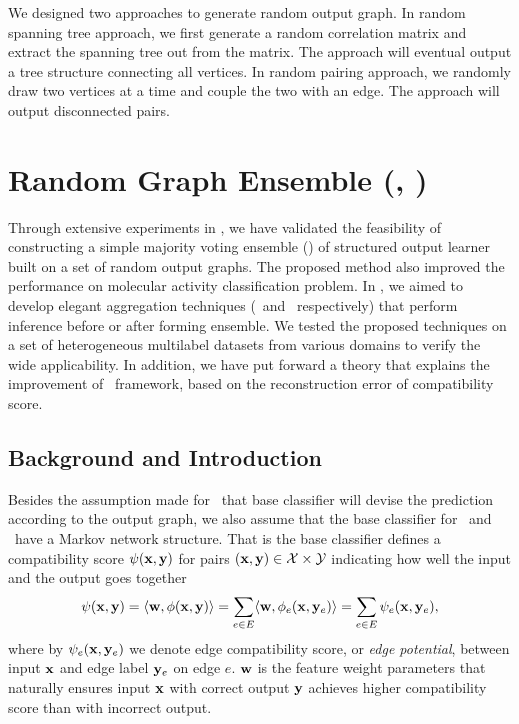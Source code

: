 {We designed two approaches to generate random output graph.
In random spanning tree approach, we first generate a random correlation matrix and extract the spanning tree out from the matrix.
The approach will eventual output a tree structure connecting all vertices.
In random pairing approach, we randomly draw two vertices at a time and couple the two with an edge.
The approach will output disconnected pairs.


%
%
\section{Random Graph Ensemble (\amm, \mam)}

Through extensive experiments in , we have validated the feasibility of constructing a simple majority voting ensemble (\mve) of structured output learner built on a set of random output graphs.
The proposed method also improved the performance on molecular activity classification problem.
In , we aimed to develop elegant aggregation techniques (\amm\ and \mam\ respectively) that perform inference before or after forming ensemble.
We tested the proposed techniques on a set of heterogeneous multilabel datasets from various domains to verify the wide applicability.
In addition, we have put forward a theory that explains the improvement of \mam\ framework, based on the reconstruction error of compatibility score.

\subsection{Background and Introduction}

Besides the assumption made for \mve\ that base classifier will devise the prediction according to the output graph, we also assume that the base classifier for \amm\ and \mam\ have a Markov network structure.
That is the base classifier defines a compatibility score $\psi(\mathbf {x},\mathbf {y})$ for pairs $(\mathbf {x},\mathbf {y})\in\mathcal{X}\times\mathcal{Y}$ indicating how well the input and the output goes together
\begin{align*}
	\psi(\mathbf {x},\mathbf {y}) = \langle \mathbf {w}, \phi(\mathbf {x},\mathbf {y}) \rangle = \sum_{e\in E}\langle \mathbf {w}, \phi_e(\mathbf {x},\mathbf {y}_e) \rangle=\sum_{e\in E}\psi_e(\mathbf {x},\mathbf {y}_e),
\end{align*}
where by $\psi_e(\mathbf {x},\mathbf {y}_e)$ we denote edge compatibility score, or \textit{edge potential}, between input $\mathbf {x}$ and edge label $\mathbf {y}_e$ on edge $e$.
$\mathbf {w}$ is the feature weight parameters that naturally ensures input $\mathbf {x}$ with correct output $\mathbf {y}$ achieves higher compatibility score than with incorrect output.

}
